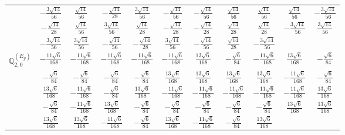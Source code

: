 \documentclass[fleqn,10pt,landscape]{article}
\begin{document}
\begin{itemize}
{\begin{center}
\begin{longtable}{ccccccccccc}
& $ - \frac{3 \sqrt{14}}{56} $ & $ \frac{\sqrt{14}}{56} $ & $ - \frac{\sqrt{14}}{28} $ & $ \frac{3 \sqrt{14}}{56} $ & $ - \frac{\sqrt{14}}{56} $ & $ - \frac{\sqrt{14}}{56} $ & $ \frac{\sqrt{14}}{56} $ & $ \frac{\sqrt{14}}{56} $ & $ \frac{\sqrt{14}}{56} $ & $ - \frac{3 \sqrt{14}}{56} $ \\
& $ - \frac{\sqrt{14}}{28} $ & $ \frac{\sqrt{14}}{56} $ & $ \frac{3 \sqrt{14}}{56} $ & $ \frac{\sqrt{14}}{28} $ & $ - \frac{\sqrt{14}}{28} $ & $ - \frac{\sqrt{14}}{28} $ & $ \frac{\sqrt{14}}{28} $ & $ \frac{\sqrt{14}}{28} $ & $ - \frac{3 \sqrt{14}}{56} $ & $ \frac{3 \sqrt{14}}{56} $ \\
& $ - \frac{3 \sqrt{14}}{56} $ & $ \frac{3 \sqrt{14}}{56} $ & $ - \frac{\sqrt{14}}{56} $ & $ - \frac{\sqrt{14}}{28} $ & $ \frac{3 \sqrt{14}}{56} $ & $ - \frac{\sqrt{14}}{56} $ & $ \frac{\sqrt{14}}{28} $ & $ - \frac{3 \sqrt{14}}{56} $ & $  $ & $  $ \\ \hline
$\mathbb{Q}_{2,0}^{(E_{g})}$ & $ - \frac{11 \sqrt{6}}{168} $ & $ - \frac{11 \sqrt{6}}{168} $ & $ - \frac{11 \sqrt{6}}{168} $ & $ - \frac{11 \sqrt{6}}{168} $ & $ - \frac{11 \sqrt{6}}{168} $ & $ \frac{13 \sqrt{6}}{168} $ & $ - \frac{\sqrt{6}}{84} $ & $ - \frac{11 \sqrt{6}}{168} $ & $ \frac{13 \sqrt{6}}{168} $ & $ - \frac{\sqrt{6}}{84} $ \\
& $ - \frac{\sqrt{6}}{84} $ & $ - \frac{\sqrt{6}}{84} $ & $ - \frac{\sqrt{6}}{84} $ & $ - \frac{\sqrt{6}}{84} $ & $ \frac{13 \sqrt{6}}{168} $ & $ \frac{13 \sqrt{6}}{168} $ & $ \frac{13 \sqrt{6}}{168} $ & $ \frac{13 \sqrt{6}}{168} $ & $ - \frac{11 \sqrt{6}}{168} $ & $ - \frac{\sqrt{6}}{84} $ \\
& $ \frac{13 \sqrt{6}}{168} $ & $ - \frac{11 \sqrt{6}}{168} $ & $ - \frac{\sqrt{6}}{84} $ & $ \frac{13 \sqrt{6}}{168} $ & $ - \frac{11 \sqrt{6}}{168} $ & $ - \frac{11 \sqrt{6}}{168} $ & $ - \frac{11 \sqrt{6}}{168} $ & $ - \frac{11 \sqrt{6}}{168} $ & $ - \frac{11 \sqrt{6}}{168} $ & $ \frac{13 \sqrt{6}}{168} $ \\
& $ - \frac{\sqrt{6}}{84} $ & $ - \frac{11 \sqrt{6}}{168} $ & $ \frac{13 \sqrt{6}}{168} $ & $ - \frac{\sqrt{6}}{84} $ & $ - \frac{\sqrt{6}}{84} $ & $ - \frac{\sqrt{6}}{84} $ & $ - \frac{\sqrt{6}}{84} $ & $ - \frac{\sqrt{6}}{84} $ & $ \frac{13 \sqrt{6}}{168} $ & $ \frac{13 \sqrt{6}}{168} $ \\
& $ \frac{13 \sqrt{6}}{168} $ & $ \frac{13 \sqrt{6}}{168} $ & $ - \frac{11 \sqrt{6}}{168} $ & $ - \frac{\sqrt{6}}{84} $ & $ \frac{13 \sqrt{6}}{168} $ & $ - \frac{11 \sqrt{6}}{168} $ & $ - \frac{\sqrt{6}}{84} $ & $ \frac{13 \sqrt{6}}{168} $ & $  $ & $  $ \\ \hline

\end{longtable}
\end{center}}
\end{itemize}
\end{document}
